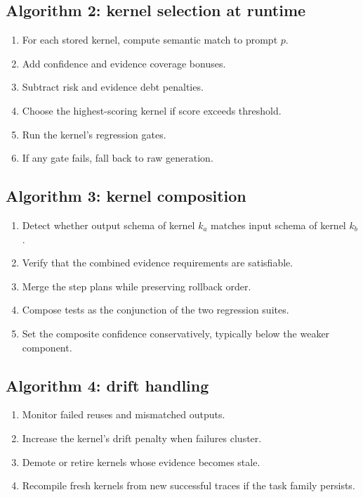 \documentclass{article}
\begin{document}
\subsection{Algorithm 2: kernel selection at runtime}
\begin{enumerate}[leftmargin=1.2em]
\item For each stored kernel, compute semantic match to prompt $p$.
\item Add confidence and evidence coverage bonuses.
\item Subtract risk and evidence debt penalties.
\item Choose the highest-scoring kernel if score exceeds threshold.
\item Run the kernel’s regression gates.
\item If any gate fails, fall back to raw generation.
\end{enumerate}

\subsection{Algorithm 3: kernel composition}
\begin{enumerate}[leftmargin=1.2em]
\item Detect whether output schema of kernel $k_a$ matches input schema of kernel $k_b$.
\item Verify that the combined evidence requirements are satisfiable.
\item Merge the step plans while preserving rollback order.
\item Compose tests as the conjunction of the two regression suites.
\item Set the composite confidence conservatively, typically below the weaker component.
\end{enumerate}

\subsection{Algorithm 4: drift handling}
\begin{enumerate}[leftmargin=1.2em]
\item Monitor failed reuses and mismatched outputs.
\item Increase the kernel’s drift penalty when failures cluster.
\item Demote or retire kernels whose evidence becomes stale.
\item Recompile fresh kernels from new successful traces if the task family persists.
\end{enumerate}
\end{document}
